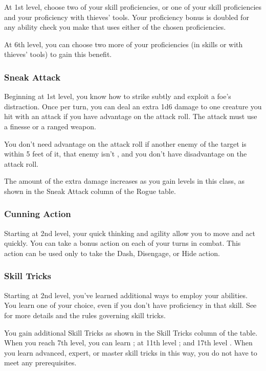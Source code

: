 At 1st level, choose two of your skill proficiencies, or one of your skill proficiencies and your proficiency with thieves' tools. Your proficiency bonus is doubled for any ability check you make that uses either of the chosen proficiencies.

At 6th level, you can choose two more of your proficiencies (in skills or with thieves' tools) to gain this benefit.

\subsubsection{Sneak Attack}

Beginning at 1st level, you know how to strike subtly and exploit a foe's distraction. Once per turn, you can deal an extra 1d6 damage to one creature you hit with an attack if you have advantage on the attack roll. The attack must use a finesse or a ranged weapon.

You don't need advantage on the attack roll if another enemy of the target is within 5 feet of it, that enemy isn't , and you don't have disadvantage on the attack roll.

The amount of the extra damage increases as you gain levels in this class, as shown in the Sneak Attack column of the Rogue table.

\subsubsection{Cunning Action}

Starting at 2nd level, your quick thinking and agility allow you to move and act quickly. You can take a bonus action on each of your turns in combat. This action can be used only to take the Dash, Disengage, or Hide action.

\subsubsection{Skill Tricks}

Starting at 2nd level, you've learned additional ways to employ your abilities. You learn one  of your choice, even if you don't have proficiency in that skill. See  for more details and the rules governing skill tricks.

You gain additional Skill Tricks as shown in the Skill Tricks column of the  table. When you reach 7th level, you can learn ; at 11th level ; and 17th level . When you learn advanced, expert, or master skill tricks in this way, you do not have to meet any prerequisites.

